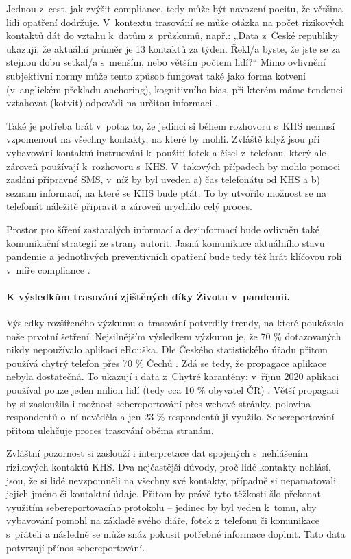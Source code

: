 Jednou z~cest, jak zvýšit compliance, tedy může být navození pocitu, že většina lidí opatření dodržuje. V~kontextu trasování se může otázka na počet rizikových kontaktů dát do vztahu k~datům z~průzkumů, např.: „Data z~České republiky ukazují, že aktuální průměr je 13 kontaktů za týden. Řekl/a byste, že jste se za stejnou dobu setkal/a s~menším, nebo větším počtem lidí?“ Mimo ovlivnění subjektivní normy může tento způsob fungovat také jako forma kotvení (v~anglickém překladu anchoring), kognitivního bias, při kterém máme tendenci vztahovat (kotvit) odpovědi na určitou informaci \cite{Tversky1974}.

Také je potřeba brát v~potaz to, že jedinci si během rozhovoru s~KHS nemusí vzpomenout na všechny kontakty, na které by mohli. Zvláště když jsou při vybavování kontaktů instruováni k~použití fotek a čísel z~telefonu, který ale zároveň používají k~rozhovoru s~KHS. V~takových případech by mohlo pomoci zaslání pří\-prav\-né SMS, v~níž by byl uveden a) čas telefonátu od KHS a b) seznam informací, na které se KHS bude ptát. To by utvořilo možnost se na telefonát náležitě připravit a zároveň urychlilo celý proces.

Prostor pro šíření zastaralých informací a dezinformací bude ovlivněn také komunikační strategií ze strany autorit. Jasná komunikace aktuálního stavu pandemie a jednotlivých preventivních opatření bude tedy též hrát klíčovou roli v~míře compliance \cite{Hyland-Wood2021}. 

\paragraph*{K výsledkům trasování zjištěných díky Životu v~pandemii.}
Výsledky roz\-ší\-ře\-né\-ho výzkumu o~trasování potvrdily trendy, na které poukázalo naše prvotní šetření. Nejsilnějším výsledkem výzkumu je, že 70 \% dotazovaných nikdy nepoužívalo aplikaci eRouška. Dle Českého statistického úřadu přitom používá chytrý telefon přes 70 \% Čechů \cite{Mana2020}. Zdá se tedy, že propagace aplikace nebyla dostatečná. To ukazují i data z~Chytré karantény: v~říjnu 2020 aplikaci používal pouze jeden milion lidí (tedy cca 10 \% obyvatel ČR) \cite{Fiser2020}. Větší propagaci by si zasloužila i možnost sebereportování přes webové stránky, polovina respondentů o~ní nevěděla a jen 23 \% respondentů ji využilo. Sebereportování přitom ulehčuje proces trasování oběma stranám. 

Zvláštní pozornost si zaslouží i interpretace dat spojených s~nehlášením rizikových kontaktů KHS. Dva nejčastější důvody, proč lidé kontakty nehlásí, jsou, že si lidé nevzpomněli na všechny své kontakty, případně si nepamatovali jejich jméno či kontaktní údaje. Přitom by právě tyto těžkosti šlo překonat využitím sebereportovacího protokolu -- jedinec by byl veden k~tomu, aby vybavování pomohl na základě svého diáře, fotek z~telefonu či komunikace s~přáteli a následně se může snáz pokusit potřebné informace doplnit. Tato data potvrzují přínos sebereportování.

